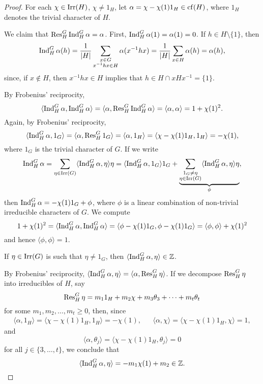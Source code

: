 \begin{proof}
  For each $\chi\in\operatorname{Irr}(H)$, $\chi\ne1_H$, let 
  $\alpha=\chi-\chi(1)1_H\in\operatorname{cf}(H)$, where $1_H$ denotes the trivial character of $H$. 

  We claim that $\operatorname{Res}_H^G\operatorname{Ind}_H^G\alpha=\alpha$.
  First, $\operatorname{Ind}_H^G\alpha(1)=\alpha(1)=0$. If $h\in H\setminus\{1\}$, then 
  \[
    \operatorname{Ind}_H^G\alpha(h)=\frac{1}{|H|}\sum_{\substack{x\in G\\x^{-1}hx\in H}}\alpha(x^{-1}hx)
    =\frac{1}{|H|}\sum_{x\in H}\alpha(h)=\alpha(h),
  \]
  since, if $x\not\in H$, then $x^{-1}hx\in H$ implies that 
  $h\in H\cap xHx^{-1}=\{1\}$.

  By Frobenius' reciprocity, 
  \begin{equation}
    \label{eq:<a,a>=1+chi2}
    \langle\operatorname{Ind}_H^G\alpha,\operatorname{Ind}_H^G\alpha\rangle
    =\langle\alpha,\operatorname{Res}_H^G\operatorname{Ind}_H^G\alpha\rangle=\langle\alpha,\alpha\rangle
    =1+\chi(1)^2.
  \end{equation}
  Again, by Frobenius' reciprocity, 
  \[
  \langle\operatorname{Ind}_H^G\alpha,1_G\rangle
  =\langle\alpha,\operatorname{Res}_H^G1_G\rangle
  =\langle\alpha,1_H\rangle
  =\langle\chi-\chi(1)1_H,1_H\rangle
  =-\chi(1),
  \]
  where $1_G$ is the trivial character of $G$. If we write 
  \[
  \operatorname{Ind}_H^G\alpha=\sum_{\eta\in\operatorname{Irr}(G)}\langle\operatorname{Ind}_H^G\alpha,\eta\rangle\eta
  =\langle\operatorname{Ind}_H^G\alpha,1_G\rangle1_G+\underbrace{\sum_{\substack{1_G\ne\eta\\\eta\in\operatorname{Irr}(G)}}\langle\operatorname{Ind}_H^G\alpha,\eta\rangle\eta}_{\phi},
  \]
  then $\operatorname{Ind}_H^G\alpha=-\chi(1)1_G+\phi$, where $\phi$ is a linear combination of non-trivial 
  irreducible characters of $G$. We compute 
  \[
  1+\chi(1)^2=\langle\operatorname{Ind}_H^G\alpha,\operatorname{Ind}_H^G\alpha\rangle
  =\langle\phi-\chi(1)1_G,\phi-\chi(1)1_G\rangle
  =\langle\phi,\phi\rangle+\chi(1)^2
  \]
  and hence $\langle\phi,\phi\rangle=1$. 
  
  \begin{claim}
  If $\eta\in\operatorname{Irr}(G)$ is such that $\eta\ne 1_G$, then 
  $\langle\operatorname{Ind}_H^G\alpha,\eta\rangle\in\mathbb{Z}$. 
  \end{claim}
  
  By Frobenius' reciprocity, $\langle\operatorname{Ind}_H^G\alpha,\eta\rangle=\langle\alpha,\operatorname{Res}_H^G\eta\rangle$. 
  If we decompose $\operatorname{Res}_H^G\eta$ into irreducibles of $H$, say 
  \[
  \operatorname{Res}_H^G\eta=m_11_H+m_2\chi+m_3\theta_3+\cdots+m_t\theta_t
  \]
  for some $m_1,m_2,\dots,m_t\geq0$, 
  then, since 
  \begin{align*}
  \langle\alpha,1_H\rangle=\langle\chi-\chi(1)1_H,1_H\rangle=-\chi(1),
  &&\langle\alpha,\chi\rangle=\langle\chi-\chi(1)1_H,\chi\rangle=1,
  \end{align*}
  and 
  \[
  \langle\alpha,\theta_j\rangle=\langle\chi-\chi(1)1_H,\theta_j\rangle=0
  \]
  for all $j\in\{3,\dots,t\}$, we conclude that 
  \[
  \langle\operatorname{Ind}_H^G\alpha,\eta\rangle=-m_1\chi(1)+m_2\in\mathbb{Z}.
  \]
  

\end{proof}
